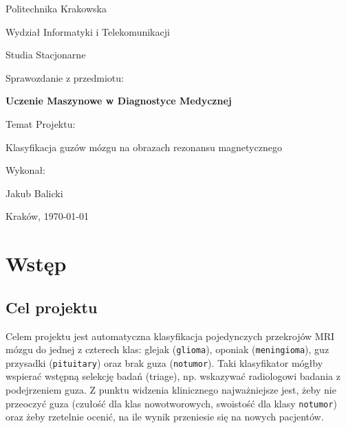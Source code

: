 \documentclass[11pt,a4paper]{article}
\begin{document}
\begin{titlepage}
\centering
{\Large Politechnika Krakowska\par}
\vspace{2mm}
{\large Wydział Informatyki i Telekomunikacji\par}
\vspace{2mm}
{\large Studia Stacjonarne\par}
\vspace{4cm}
{\large Sprawozdanie z przedmiotu:\par}
\vspace{2mm}
{\LARGE\bfseries Uczenie Maszynowe w Diagnostyce Medycznej\par}
\vspace{2cm}
{\large Temat Projektu:\par}
\vspace{2mm}
{\Large Klasyfikacja guzów mózgu na obrazach rezonansu magnetycznego\par}
\vfill
\begin{flushright}
{\large Wykonał:\par}
{\large Jakub Balicki\par}
\end{flushright}
\vspace{1cm}
{\large Kraków, \today\par}
\end{titlepage}

\tableofcontents
\newpage

\section{Wstęp}

\subsection*{Cel projektu}
Celem projektu jest automatyczna klasyfikacja pojedynczych przekrojów MRI mózgu do jednej
z czterech klas: glejak (\texttt{glioma}), oponiak (\texttt{meningioma}), guz przysadki
(\texttt{pituitary}) oraz brak guza (\texttt{notumor}). Taki klasyfikator mógłby wspierać
wstępną selekcję badań (triage), np. wskazywać radiologowi badania z podejrzeniem guza.
Z punktu widzenia klinicznego najważniejsze jest, żeby nie przeoczyć guza (czułość dla klas
nowotworowych, swoistość dla klasy \texttt{notumor}) oraz żeby rzetelnie ocenić, na ile
wynik przeniesie się na nowych pacjentów.
\end{document}
